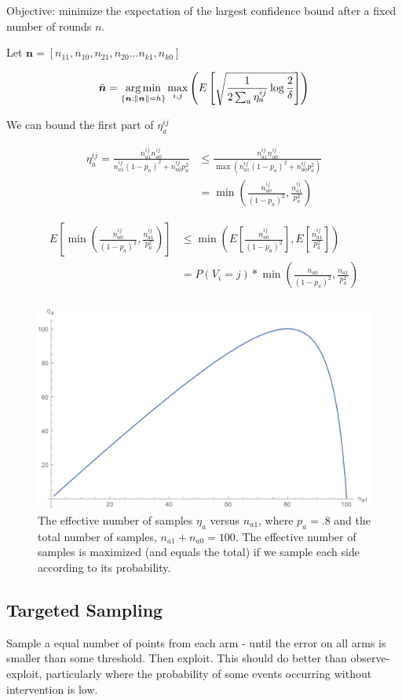 \documentclass{article}
\newcommand{\argmin}{\operatornamewithlimits{arg\,min}}
\newcommand{\eqn}[1]{\begin{align}#1\end{align}}
\theoremstyle{plain}
\theoremstyle{definition}
\begin{document}
Objective: minimize the expectation of the largest confidence bound after a fixed number of rounds $n$. 

Let $\boldsymbol{n} = [n_{11},n_{10},n_{21},n_{20}...n_{k1},n_{k0}]$

\eqn{
\tilde{\boldsymbol{n}} = \argmin_{\{\boldsymbol{n}:\|\boldsymbol{n}\|=h\}} \max_{i,j} \left( E \left[ \sqrt{\frac{1}{2\sum_a \eta_a^{ij}} \log{\frac{2}{\delta}}} \right] \right)
}

We can bound the first part of $\eta_a^{ij}$

\eqn {
\eta_a^{ij} = \frac{n_{a1}^{ij}n_{a0}^{ij}}{n_{a1}^{ij}(1-p_a)^2+n_{a0}^{ij}p_a^2} & \leq \frac{n_{a1}^{ij}n_{a0}^{ij}}{\max(n_{a1}^{ij}(1-p_a)^2+n_{a0}^{ij}p_a^2)} \\
& = \min \left( \frac{n_{a0}^{ij}}{(1-p_a)^2}, \frac{n_{a1}^{ij}}{p_a^2} \right)
}

\eqn {
E \left[ \min \left( \frac{n_{a0}^{ij}}{(1-p_a)^2}, \frac{n_{a1}^{ij}}{p_a^2} \right)  \right] & \leq 
\min \left( E\left[\frac{n_{a0}^{ij}}{(1-p_a)^2} \right], E\left[\frac{n_{a1}^{ij}}{p_a^2} \right] \right) \\
& = P(V_i = j) *\min \left( \frac{n_{a0}}{(1-p_a)^2} , \frac{n_{a1}}{p_a^2}  \right) \\
}


\begin{figure}[H]
\centering
\caption{The effective number of samples $\eta_a$ versus $n_{a1}$, where $p_a = .8$ and the total number of samples,  $ n_{a1}+n_{a0}=100$. The effective number of samples is maximized (and equals the total) if we sample each side according to its probability.}
\includegraphics[width=.5\textwidth]{samplehalves}
\end{figure}

\subsection{Targeted Sampling}
Sample a equal number of points from each arm - until the error on all arms is smaller than some threshold. Then exploit. This should do better than observe-exploit, particularly where the probability of some events occurring without intervention is low.
\end{document}
